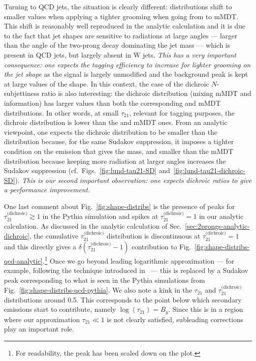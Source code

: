 Turning to QCD jets, the situation is clearly different: distributions
shift to smaller values when applying a tighter grooming \ie when
going from \SD to mMDT. This shift is reasonably well reproduced in
the analytic calculation and it is due to the fact that jet shapes are
sensitive to radiations at large angles --- larger than the angle of
the two-prong decay dominating the jet mass --- which is present in
QCD jets, but largely absent in W jets.
%
{\em This has a very important consequence: one expects the tagging
  efficiency to increase for lighter grooming on the jet shape} as the
signal is largely unmodified and the background peak is kept at large
values of the shape.
%
In this context, the case of the dichroic $N$-subjettiness ratio is
also interesting: the dichroic distribution (mixing mMDT and \SD
information) has larger values than both the corresponding \SD and mMDT
distributions.
%
In other words, at small $\tau_{21}$, relevant for tagging purposes,
the dichroic distribution is lower than the \SD and mMDT ones.
%
From an analytic viewpoint, one expects the dichroic distribution to
be smaller than the \SD distribution because, for the same Sudakov
suppression, it imposes a tighter condition on the emission that gives
the mass, and smaller than the mMDT distribution because keeping more
radiation at larger angles increases the Sudakov suppression
(cf.~Figs.~\ref{fig:lund-tau21-SD}
and~\ref{fig:lund-tau21-dichroic-SD}).
%
{\em This is our second important observation: one expects dichroic
  ratios to give a performance improvement.}


One last comment about Fig.~\ref{fig:shape-distribs} is the presence
of peaks for $\tau_{21}^\text{(dichroic)}\gtrsim 1$ in the Pythia
simulation and spikes at $\tau_{21}^\text{(dichroic)}=1$ in our
analytic calculation.
%
As discussed in the analytic calculation of
Sec.~\ref{sec:2prongs-analytic-dichroic}, the cumulative
$\tau_{21}^\text{(dichroic)}$ distribution is discontinuous at
$\tau_{21}^\text{(dichroic)}=1$ and this directly gives a
$\delta(\tau_{21}^\text{(dichroic)}-1)$ contribution to
Fig.~\ref{fig:shape-distribs-qcd-analytic}.\footnote{For readability,
  the  peak has been scaled down on the plot.}
%
Once we go beyond leading logarithmic approximation --- for example,
following the technique introduced in~\cite{Napoletano:2018ohv} ---
this is replaced by a Sudakov peak corresponding to what is seen in the
Pythia simulations from Fig.~\ref{fig:shape-distribs-qcd-pythia}.
%
We also note a kink in the $\tau_{21}$ and
$\tau_{21}^\text{(dichroic)}$ distributions around 0.5. This
corresponds to the point below which secondary emissions start to
contribute, namely $\log(\tau_{21})=B_g$.
%
Since this is in a region where our approximation $\tau_{21}\ll 1$ is
not clearly satisfied, subleading corrections play an important role.


